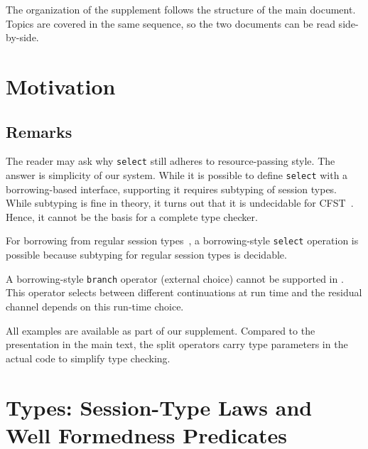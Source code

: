 \appendix


The organization of the supplement follows the structure of the main document.
Topics are covered in the same sequence, so the two documents can be read
side-by-side.


\section{Motivation}

\subsection{Remarks}
\label{sec:remarks}

The reader may ask why \lstinline{select} still adheres to
resource-passing style. The answer is simplicity of our system. While it
is possible to define \lstinline{select} with a borrowing-based
interface, supporting it requires subtyping of session types. While
subtyping is fine in theory, it turns out that it is undecidable for
CFST~\cite{DBLP:journals/toplas/Padovani19}. Hence, it cannot be the
basis for a complete type checker.

For borrowing from regular session
types~\cite{DBLP:journals/pacmpl/SaffrichS0V25}, a borrowing-style
\lstinline{select} operation is possible because subtyping for regular
session types is decidable.

A borrowing-style \lstinline{branch} operator (external choice) cannot be supported in \thecalculus.
This operator selects between different continuations at run time and
the residual channel depends on this run-time choice.


All \thecalculus examples are available as part of our supplement. Compared to the
presentation in the main text, the split operators carry type
parameters in the actual code to simplify type checking.

\clearpage

\section{Types: Session-Type Laws and Well Formedness Predicates}
\label{sec:appendix-types}

